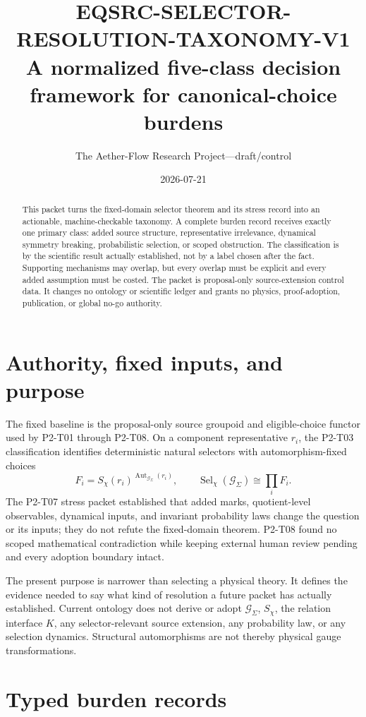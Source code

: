 \documentclass[11pt]{article}
\title{EQSRC-SELECTOR-RESOLUTION-TAXONOMY-V1\\
A normalized five-class decision framework for canonical-choice burdens}
\author{The Aether-Flow Research Project---draft/control}
\date{2026-07-21}
\newcommand{\G}{\mathcal G_{\Sigma}}
\newcommand{\Sel}{\operatorname{Sel}_{\chi}}
\newcommand{\Aut}{\operatorname{Aut}}
\begin{document}
\maketitle

\begin{abstract}
This packet turns the fixed-domain selector theorem and its stress record into
an actionable, machine-checkable taxonomy.  A complete burden record receives
exactly one primary class: added source structure, representative irrelevance,
dynamical symmetry breaking, probabilistic selection, or scoped obstruction.
The classification is by the scientific result actually established, not by a
label chosen after the fact.  Supporting mechanisms may overlap, but every
overlap must be explicit and every added assumption must be costed.  The packet
is proposal-only source-extension control data.  It changes no ontology or
scientific ledger and grants no physics, proof-adoption, publication, or global
no-go authority.
\end{abstract}

\section{Authority, fixed inputs, and purpose}

The fixed baseline is the proposal-only source groupoid and eligible-choice
functor used by P2-T01 through P2-T08.  On a component representative $r_i$,
the P2-T03 classification identifies deterministic natural selectors with
automorphism-fixed choices
\[
  F_i=S_\chi(r_i)^{\Aut_{\G}(r_i)},
  \qquad
  \Sel(\G)\cong\prod_i F_i.
\]
The P2-T07 stress packet established that added marks, quotient-level
observables, dynamical inputs, and invariant probability laws change the
question or its inputs; they do not refute the fixed-domain theorem.  P2-T08
found no scoped mathematical contradiction while keeping external human
review pending and every adoption boundary intact.

The present purpose is narrower than selecting a physical theory.  It defines
the evidence needed to say what kind of resolution a future packet has
actually established.  Current ontology does not derive or adopt $\G$,
$S_\chi$, the relation interface $K$, any selector-relevant source extension,
any probability law, or any selection dynamics.  Structural automorphisms are
not thereby physical gauge transformations.

\section{Typed burden records}
\end{document}
